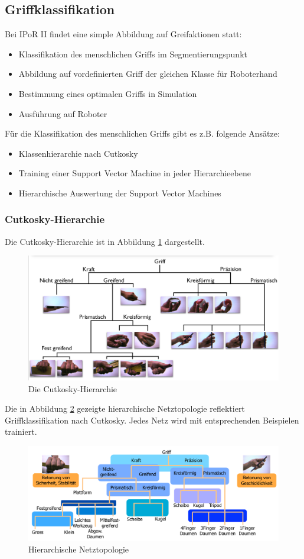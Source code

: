 \subsection{Griffklassifikation}
Bei IPoR II findet eine simple Abbildung auf Greifaktionen statt:
\begin{itemize}
\item Klassifikation des menschlichen Griffs im Segmentierungspunkt
\item Abbildung auf vordefinierten Griff der gleichen Klasse für Roboterhand
\item Bestimmung eines optimalen Griffs in Simulation
\item Ausführung auf Roboter
\end{itemize}
Für die Klassifikation des menschlichen Griffs gibt es z.B. folgende Ansätze:
\begin{itemize}
\item Klassenhierarchie nach Cutkosky
\item Training einer Support Vector Machine in jeder Hierarchieebene 
\item Hierarchische Auswertung der Support Vector Machines
\end{itemize}
\subsubsection*{Cutkosky-Hierarchie}
Die Cutkosky-Hierarchie ist in Abbildung \ref{fig:ch04_cuthie} dargestellt.
\begin{figure}[ht]\centering 
\includegraphics[width=0.6\linewidth]{figures/ch04_cutkosky.png}
\caption{Die Cutkosky-Hierarchie}
\label{fig:ch04_cuthie}
\end{figure}
Die in Abbildung \ref{fig:ch04_netztopo} gezeigte hierarchische Netztopologie reflektiert Griffklassifikation nach Cutkosky. Jedes Netz wird mit entsprechenden Beispielen trainiert.
\begin{figure}[ht]\centering 
\includegraphics[width=0.6\linewidth]{figures/ch04_netztopo.png}
\caption{Hierarchische Netztopologie}
\label{fig:ch04_netztopo}
\end{figure}
